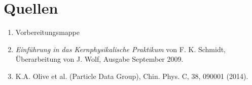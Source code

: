 \documentclass[a4paper,ngerman]{scrartcl}
\begin{document}
\section{Quellen}
\begin{enumerate}
\item Vorbereitungsmappe 
\item \emph{Einführung in das Kernphysikalische Praktikum} von F. K. Schmidt, 
  Überarbeitung von J. Wolf, Ausgabe September 2009. \label{ref:bb}
\item K.A. Olive et al. (Particle Data Group), Chin. Phys. C, 38, 090001 (2014). \label{ref:pdg14}
\end{enumerate}
\end{document}
